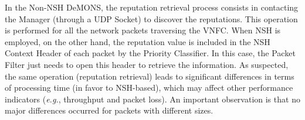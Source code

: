 In the Non-NSH DeMONS, the reputation retrieval process consists in contacting the Manager (through a UDP Socket) to discover the reputations. This operation is performed for all the network packets traversing the VNFC. When NSH is employed, on the other hand, the reputation value is included in the NSH Context Header of each packet by the Priority Classifier. In this case, the Packet Filter just needs to open this header to retrieve the information. As suspected, the same operation (reputation retrieval) leads to significant differences in terms of processing time (in favor to NSH-based), which may affect other performance indicators (\textit{e.g.}, throughput and packet loss). An important observation is that no major differences occurred for packets with different sizes.

